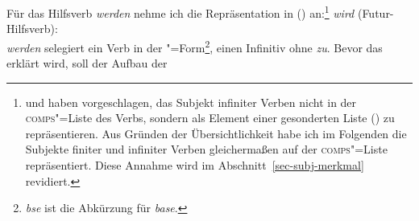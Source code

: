 Für das Hilfsverb \emph{werden} nehme ich die Repräsentation in () an:\footnote{\label{subj-fn}%
        \citet{Pollard90a} und \citet*{Kiss92} haben vorgeschlagen, das Subjekt infiniter
Verben nicht in der \textsc{comps}"=Liste des Verbs, sondern als Element einer gesonderten Liste (\subj)
zu repräsentieren. Aus Gründen der Übersichtlichkeit habe ich im Folgenden die Subjekte finiter
und infiniter Verben gleichermaßen auf der \textsc{comps}"=Liste repräsentiert. Diese Annahme
wird im Abschnitt~\ref{sec-subj-merkmal} revidiert.%
}
\eas
\label{le-wird}%
\emph{wird} (Futur-Hilfsverb):\\
\zs
\emph{werden} selegiert ein Verb in der "=Form\footnote{%
  \emph{bse} ist die Abkürzung für \emph{base}.%
}, \dash einen Infinitiv ohne \emph{zu}. Bevor das \lexm erklärt wird, soll der Aufbau der \compsl
